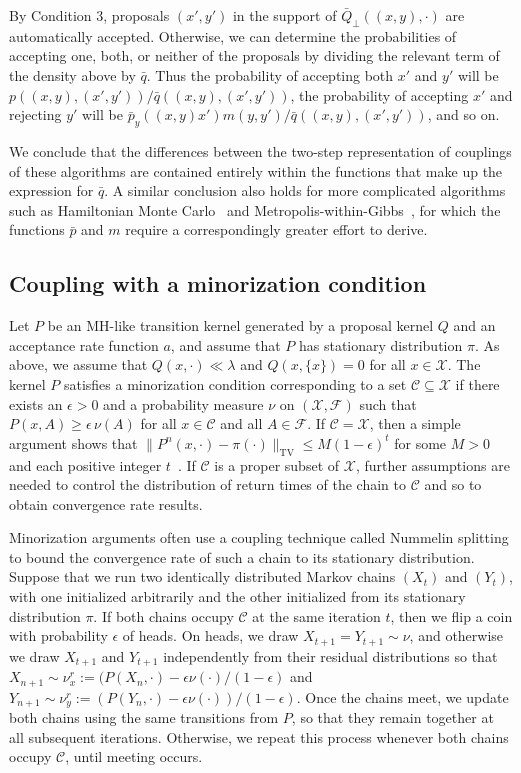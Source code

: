 \documentclass[aihp]{imsart}
\theoremstyle{plain}
\theoremstyle{remark}
\theoremstyle{definition} \newtheorem{example}{Example}
\newcommand{\scrF}{\mathscr{F}}
\newcommand{\calC}{\mathcal{C}}
\newcommand{\calX}{\mathcal{X}}
\newcommand{\eps}{\epsilon}
\newcommand{\TV}{\mathrm{TV}}
\newcommand{\bq}{\bar Q}
\newcommand{\sx}{\{ x \}}
\newcommand{\xy}{(x,y)}
\newcommand{\xyp}{(x',y')}
\begin{document}
By Condition 3, proposals $\xyp$ in the support of $\bq_\perp(\xy, \cdot)$ are automatically
accepted. Otherwise, we can determine the probabilities of accepting one, both, or neither of the
proposals by dividing the relevant term of the density above by $\bar q$. Thus the probability of
accepting both $x'$ and $y'$ will be $p(\xy, \xyp)/\bar q(\xy,\xyp)$, the probability of accepting
$x'$ and rejecting $y'$ will be $\bar p_y(\xy x') m(y,y') / \bar q(\xy, \xyp)$, and so on.

We conclude that the differences between the two-step representation of couplings of these
algorithms are contained entirely within the functions that make up the expression for $\bar q$. A
similar conclusion also holds for more complicated algorithms such as Hamiltonian Monte
Carlo~\citep{Duane:1987, Neal1993, neal2011mcmc} and Metropolis-within-Gibbs~\citep{Metropolis1953,
	gelfand1990sampling}, for which the functions $\bar p$ and $m$ require a correspondingly greater
effort to derive.

\subsection{Coupling with a minorization condition} \label{sec:minorization}

Let $P$ be an MH-like transition kernel generated by a proposal kernel $Q$ and an acceptance rate
function $a$, and assume that $P$ has stationary distribution $\pi$. As above, we assume that $Q(x,
\cdot) \ll \lambda$ and $Q(x, \sx) = 0$ for all $x \in \calX$. The kernel $P$ satisfies a
minorization condition corresponding to a set $\calC \subseteq \calX$ if there exists an $\eps > 0$ and
a probability measure $\nu$ on $(\calX, \scrF)$ such that $P(x,A) \geq  \epsilon\, \nu(A)$ for all
$x \in \calC$ and all $A \in \scrF$. If $\calC = \calX$, then a simple argument shows that $\lVert
P^n(x,\cdot) - \pi(\cdot) \rVert_{\TV} \leq M (1 - \epsilon)^t$ for some $M>0$ and each positive
integer $t$~\citep{meyn2012markov}. If $\calC$ is a proper subset of $\calX$, further assumptions
are needed to control the distribution of return times of the chain to $\calC$ and so to obtain
convergence rate results.

Minorization arguments often use a coupling technique called Nummelin splitting
\citep{nummelin1978uniform, athreya1978new, jones2001honest, gelman2010handbook} to bound the
convergence rate of such a chain to its stationary distribution. Suppose that we run two identically
distributed Markov chains $(X_t)$ and $(Y_t)$, with one initialized arbitrarily and the
other initialized from its stationary distribution $\pi$. If both chains occupy $\calC$ at the same iteration
$t$, then we flip a coin with probability $\eps$ of heads. On heads, we draw
$X_{t+1} = Y_{t+1} \sim \nu$, and otherwise we draw $X_{t+1}$ and $Y_{t+1}$ independently from their
residual distributions so that $X_{n+1} \sim \nu^r_x := (P(X_n,\cdot) - \epsilon \nu(\cdot) / (
1-\epsilon)$ and $Y_{n+1}\sim \nu^r_y := (P(Y_n,\cdot) - \epsilon \nu(\cdot))/(1-\epsilon)$.
Once the chains meet, we update both chains using the same transitions from $P$, so that they
remain together at all subsequent iterations. Otherwise, we repeat this process whenever both chains
occupy $\calC$, until meeting occurs.
\end{document}
